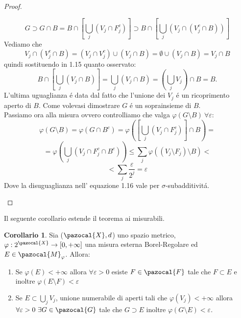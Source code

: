 \documentclass[11pt,a4paper]{report}
\theoremstyle{plain}
\theoremstyle{definition}
\newtheorem{cor}[thm]{Corollario} %
\newcommand{\M}{\pazocal{M}_\varphi}
\newcommand{\X}{\pazocal{X}}
\newcommand{\F}{\pazocal{F}}
\newcommand{\G}{\pazocal{G}}
\begin{document}
\begin{proof}
\begin{enumerate}
		\begin{equation}		
		G \supset G \cap B = B \cap \left[\bigcup\limits_{j}(V_j \cap F_j^c)\right] \supset B \cap \left[\bigcup\limits_{j}\left(V_j \cap (V_j^c \cap B)\right)\right]
		\end{equation}		
		Vediamo che 
		\[
			V_j \cap (V_j^c \cap B) = (V_j \cap V_j^c)\cup (V_j \cap B) = \emptyset \cup (V_j \cap B) = V_j \cap B
		\] 
		quindi sostituendo in 1.15 quanto osservato:
		\[
			B \cap \left[\bigcup\limits_{j}\left(V_j \cap B\right)\right]	= \bigcup\limits_{j}\left(V_j \cap B\right) = (\bigcup\limits_{j}V_j)\cap B = B.	
		\]
		L'ultima uguaglianza \'e data dal fatto che l'unione dei $V_j$ \'e un ricoprimento aperto di $B$. Come volevasi dimostrare $G$ \'e un soprainsieme di $B$.\\
		Passiamo ora alla misura ovvero controlliamo che valga $\varphi(G \setminus B)\ \forall \varepsilon$:
		\[
			\varphi(G \setminus B) = \varphi(G \cap B^c) = \varphi([\bigcup\limits_{j}(V_j \cap F_j^c)] \cap B) =
		\]
		\begin{equation}
			= 	\varphi(\bigcup\limits_{j}(V_j \cap F_j^c \cap B^c)) \le \sum\limits_{j}\varphi((V_j \setminus F_j)\setminus B) <
		\end{equation}
		\[			
			< \sum\limits_{j}\frac{\varepsilon}{2^j}=\varepsilon
		\]
		Dove la disuguaglianza nell' equazione 1.16 vale per $\sigma$-subadditivit\'a.
	\end{enumerate}		
\end{proof}
Il seguente corollario estende il teorema ai misurabili.
\begin{cor}
	Sia ($\X, d$) uno spazio metrico, $\varphi : 2^\X \rightarrow [0,+\infty]$ una misura esterna Borel-Regolare ed $E\in \M$. Allora:
	\begin{enumerate}
		\item Se $\varphi(E) < +\infty$ allora $\forall \varepsilon > 0$ esiste $F \in \F$ tale che $F \subset E$ e inoltre $\varphi(E \setminus F) < \varepsilon$
		\item Se $E \subset \bigcup\limits_{j}V_j$, unione numerabile di aperti tali che $\varphi(V_j) < + \infty$ allora $\forall \varepsilon >0\ \exists G \in \G$ tale che $G \supset E$ inoltre $\varphi(G \setminus E) < \varepsilon$.
	\end{enumerate}
\end{cor}
\end{document}
